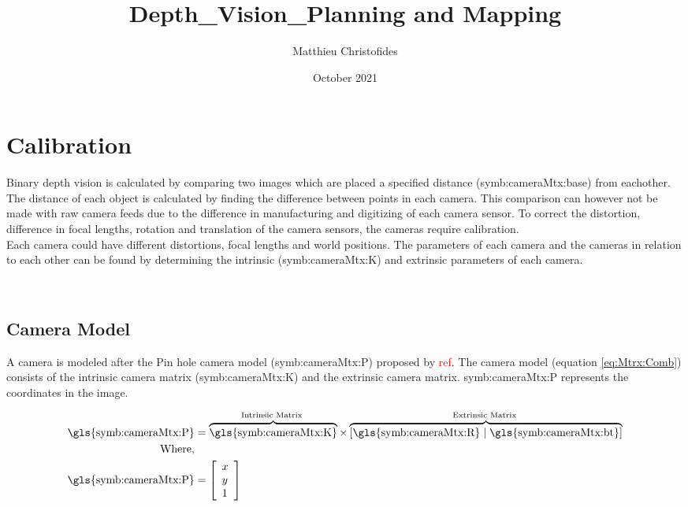 \documentclass{article}
\title{Depth_Vision_Planning and Mapping}
\author{Matthieu Christofides}
\date{October 2021}
\newcommand{\rf}[1]{\textcolor{red}{#1}}
\newcommand{\sie}[1]{\text{\gls{symb:cameraMtx:#1}}}   %
\newcommand{\sba}[1]{\gls{symb:cameraMtx:#1}}          %
\newcommand{\symbsec}[1]{
    \renewcommand{\sie}[1]{\text{\gls{symb:#1:##1}}}
    \renewcommand{\sba}[1]{\gls{symb:#1:##1}}
}
\begin{document}
\newpage

\tableofcontents

\section{Calibration}

Binary depth vision is calculated by comparing two images which are placed a specified distance (\sba{base}) from eachother.  The distance of each object is calculated by finding the difference between points in each camera.  This comparison can however not be made with raw camera feeds due to the difference in manufacturing and digitizing of each camera sensor.  To correct the distortion, difference in focal lengths, rotation and translation of the camera sensors, the cameras require calibration.\\

Each camera could have different distortions, focal lengths and world positions.  The parameters of each camera and the cameras in relation to each other can be found by determining the intrinsic (\sba{K}) and extrinsic parameters of each camera.



\  \\

\subsection{Camera Model} \label{sec:cameraMtx}
\symbsec{cameraMtx}

A camera is modeled after the Pin hole camera model (\sba{P}) proposed by \rf{ref}.  The camera model (equation \ref{eq:Mtrx:Comb}) consists of the intrinsic camera matrix (\sba{K}) and the extrinsic camera matrix.  \sba{P} represents the coordinates in the image.

\begin{align}
\begin{split}\label{eq:Mtrx:Comb}
    \sie{P} &= \overbrace{\sie{K}}^{\text {Intrinsic Matrix }} \times \overbrace{[\sie{R} \mid \sie{bt}]}^{\text {Extrinsic Matrix }} \\
    \text{Where,}& \\
    \sie{P} &= \left[\begin{array}{l}
x \\
y \\
1
\end{array}\right]
\end{split}
\end{align}
\end{document}
